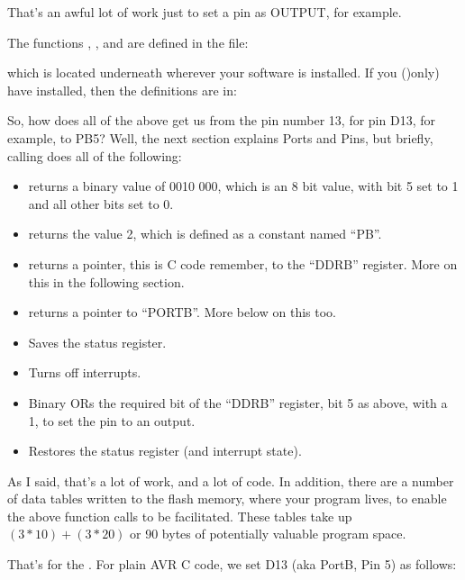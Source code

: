 That's an awful lot of work just to set a pin as OUTPUT, for example.

The functions , ,  and  are defined in the file:


which is located underneath wherever your  software is installed. If you ()only) have  installed, then the definitions are in:


So, how does all of the above get us from the pin number 13, for pin D13, for example, to PB5? Well, the next section explains Ports and Pins, but briefly, calling  does all of the following:

\begin{itemize}
	\item {} returns a binary value of 0010 000, which is an 8 bit value, with bit 5 set to 1 and all other bits set to 0.
	\item {} returns the value 2, which is defined as a constant named ``PB''.
	\item {} returns a pointer, this is C code remember, to the ``DDRB'' register. More on this in the following section.
	\item {} returns a pointer to ``PORTB''. More below on this too.
	\item Saves the status register.
	\item Turns off interrupts.
	\item Binary ORs the required bit of the ``DDRB'' register, bit 5 as above, with a 1, to set the pin to an output.
	\item Restores the status register (and interrupt state).
\end{itemize}

As I said, that's a lot of work, and a lot of code. In addition, there are a number of data tables written to the flash memory, where your program lives, to enable the above function calls to be facilitated. These tables take up $(3 * 10) + (3 * 20)$ or 90 bytes of potentially valuable program space.

That's for the . For plain AVR C code, we set D13 (aka PortB, Pin 5) as follows:

